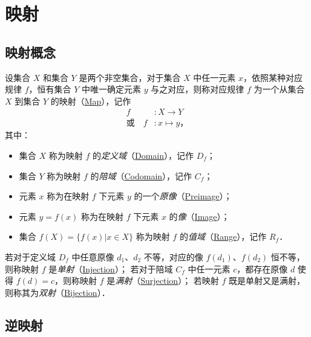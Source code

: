 \newpage
\section{映射}

\subsection{映射概念}

设集合 $X$ 和集合 $Y$ 是两个非空集合，对于集合 $X$ 中任一元素 $x$，依照某种对应规律 $f$，恒有集合 $Y$ 中唯一确定元素 $y$ 与之对应，则称对应规律 $f$ 为一个从集合 $X$ 到集合 $Y$ 的映射（\href{http://mathworld.wolfram.com/Map.html}{Map}），记作
\[
\begin{aligned}
f&: X \to Y \\
\text{或} \quad f&: x \mapsto y \text{，}
\end{aligned}
\]
其中：
\begin{itemize}
    \item 集合 $X$ 称为映射 $f$ 的\emph{定义域}（\href{http://mathworld.wolfram.com/Domain.html}{Domain}），记作 $D_f$；
    \item 集合 $Y$ 称为映射 $f$ 的\emph{陪域}（\href{http://mathworld.wolfram.com/Codomain.html}{Codomain}），记作 $C_f$；
    \item 元素 $x$ 称为在映射 $f$ 下元素 $y$ 的一个\emph{原像}（\href{http://mathworld.wolfram.com/Preimage.html}{Preimage}）；
    \item 元素 $y=f(x)$ 称为在映射 $f$ 下元素 $x$ 的\emph{像}（\href{http://mathworld.wolfram.com/Image.html}{Image}）；
    \item 集合 $f(X)=\{f(x)|x\in{}X\}$ 称为映射 $f$ 的\emph{值域}（\href{http://mathworld.wolfram.com/Range.html}{Range}），记作 $R_f$．
\end{itemize}

若对于定义域 $D_f$ 中任意原像 $d_1$、$d_2$ 不等，对应的像 $f(d_1)$、$f(d_2)$ 恒不等，则称映射 $f$ 是\emph{单射}（\href{http://mathworld.wolfram.com/Injection.html}{Injection}）；
若对于陪域 $C_f$ 中任一元素 $c$，都存在原像 $d$ 使得 $f(d)=c$，则称映射 $f$ 是\emph{满射}（\href{http://mathworld.wolfram.com/Surjection.html}{Surjection}）；
若映射 $f$ 既是单射又是满射，则称其为\emph{双射}（\href{http://mathworld.wolfram.com/Bijection.html}{Bijection}）．

\subsection{逆映射}

